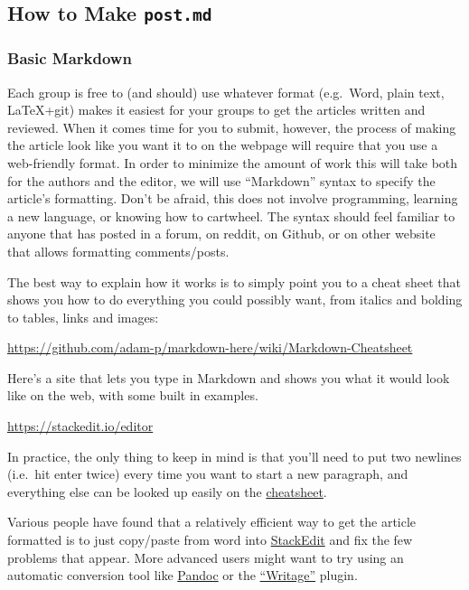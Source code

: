 \documentclass[paper=a4, fontsize=11pt]{scrartcl}
\numberwithin{equation}{section}        %
\numberwithin{figure}{section}            %
\numberwithin{table}{section}                %
\begin{document}
\begin{itemize}
\end{itemize}


\subsection{How to Make \texttt{\textbf{post.md}}}

\subsubsection{Basic Markdown}

Each group is free to (and should) use whatever format (e.g.\ Word, plain text,
LaTeX+git) makes it easiest for your groups to get the articles written and
reviewed. When it comes time for you to submit, however, the process of making
the article look like you want it to on the webpage will require that you use a web-friendly
format. In order to minimize the amount of work this will take both for the
authors and the editor, we will use ``Markdown'' syntax to specify the article's
formatting. Don't be afraid, this does not involve programming, learning a new
language, or knowing how to cartwheel. The syntax should feel familiar to anyone
that has posted in a forum, on reddit, on Github, or on other website that allows
formatting comments/posts.

The best way to explain how it works is to simply point you to a cheat
sheet that shows you how to do everything you could possibly want,
from italics and bolding to tables, links and images:

\url{https://github.com/adam-p/markdown-here/wiki/Markdown-Cheatsheet}

Here's a site that lets you type in Markdown and shows you what it would
look like on the web, with some built in examples.

\url{https://stackedit.io/editor}

In practice, the only thing to keep in mind is that you'll need to put
two newlines (i.e.\ hit enter twice) every time you want to start a new
paragraph, and everything else can be looked up easily on the
\href{https://github.com/adam-p/markdown-here/wiki/Markdown-Cheatsheet}{cheatsheet}.

Various people have found
that a relatively efficient way to get the article formatted is to just copy/paste
from word into \href{https://stackedit.io/editor}{StackEdit} and fix the few problems that appear. More advanced users
might want to try using an automatic conversion tool like
\href{http://pandoc.org/demos.html}{Pandoc} or the
\href{http://www.writage.com/}{``Writage''} plugin.
\end{document}
